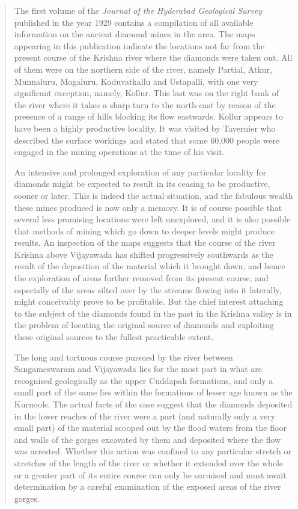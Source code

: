 \begin{quote}
{The first volume of the {\em Journal of the Hyderabad Geological Survey} published in the year 1929 contains a compilation of all available information on the ancient diamond mines in the area. The maps appearing in this publication indicate the locations not far from the present course of the Krishna river where the diamonds were taken out. All of them were on the northern side of the river, namely Partial, Atkur, Munnaluru, Mogaluru, Koduvatkallu and Ustapalli, with one very significant exception, namely, Kollur. This last was on the right bank of the river where it takes a sharp turn to the north-east by reason of the presence of a range of hills blocking its flow eastwards. Kollur appears to have been a highly productive locality. It was visited by Tavernier who described the surface workings and stated that some 60,000 people were engaged in the mining operations at the time of his visit.

An intensive and prolonged exploration of any particular locality for diamonds might be expected to result in its ceasing to be productive, sooner or later. This is indeed the actual situation, and the fabulous wealth these mines produced is now only a memory. It is of course possible that several less promising locations were left unexplored, and it is also possible that methods of mining which go down to deeper levels might produce results. An inspection of the maps suggests that the course of the river Krishna above Vijayawada has shifted progressively southwards as the result of the deposition of the material which it brought down, and hence the exploration of areas further removed from its present course, and especially of the areas silted over by the streams flowing into it laterally, might conceivably prove to be profitable. But the chief interest attaching to the subject of the diamonds found in the past in the Krishna valley is in the problem of locating the original source of diamonds and exploiting these original sources to the fullest practicable extent.

The long and tortuous course pursued by the river between Sanga\-meswaram and Vijayawada lies for the most part in what are recognised geologically as the upper Cuddapah formations, and only a small part of the same lies within the formations of
lesser age known as the Kurnools. The actual facts of the case suggest that the diamonds deposited in the lower reaches of the river were a part (and naturally only a very small part) of the material scooped out by the flood waters from the floor and walls of the gorges excavated by them and deposited where the flow was arrested. Whether this action was confined to any particular stretch or stretches of the length of the river or whether it extended over the whole or a greater part of its entire course can only be surmised and must await determination by a careful examination of the exposed areas of the river gorges.

}
\end{quote}
